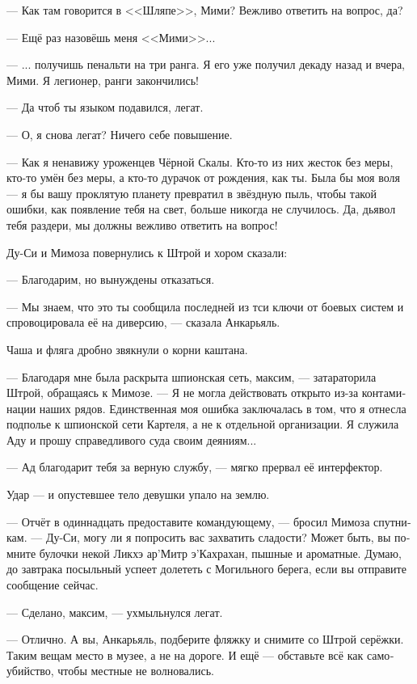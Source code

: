 \documentclass[a4paper,12pt,fleqn]{book}\usepackage{polyglossia}\setdefaultlanguage[babelshorthands=true]{russian}\setotherlanguage{english}\defaultfontfeatures{Ligatures=TeX,Mapping=tex-text}\usepackage{xcolor}\newcommand{\ml}[3]{#2}
\begin{document}
--- Как там говорится в <<Шляпе>>, Мими?
Вежливо ответить на вопрос, да?

--- Ещё раз назовёшь меня <<Мими>>...

---  ... получишь пенальти на три ранга.
Я его уже получил декаду назад и вчера, Мими.
\ml{$0$}
{Я легионер, ранги закончились!}
{I'm a leggionaire, I'm out of ranks!''}

\ml{$0$}
{--- Да чтоб ты языком подавился, легат.}
{``Choke on your tongue, legate.''}

\ml{$0$}
{--- О, я снова легат?}
{``Whoa, I'm a legate, again?}
\ml{$0$}
{Ничего себе повышение.}
{Quite a promotion.''}

--- Как я ненавижу уроженцев Чёрной Скалы.
Кто-то из них жесток без меры, кто-то умён без меры, а кто-то дурачок от рождения, как ты.
Была бы моя воля --- я бы вашу проклятую планету превратил в звёздную пыль, чтобы такой ошибки, как появление тебя на свет, больше никогда не случилось.
Да, дьявол тебя раздери, мы должны вежливо ответить на вопрос!

Ду-Си и Мимоза повернулись к Штрой и хором сказали:

--- Благодарим, но вынуждены отказаться.

--- Мы знаем, что это ты сообщила последней из тси ключи от боевых систем и спровоцировала её на диверсию, --- сказала Анкарьяль.

Чаша и фляга дробно звякнули о корни каштана.

--- Благодаря мне была раскрыта шпионская сеть, максим, --- затараторила Штрой, обращаясь к Мимозе.
--- Я не могла действовать открыто из-за контаминации наших рядов.
Единственная моя ошибка заключалась в том, что я отнесла подполье к шпионской сети Картеля, а не к отдельной организации.
Я служила Аду и прошу справедливого суда своим деяниям...

--- Ад благодарит тебя за верную службу, --- мягко прервал её интерфектор.

Удар --- и опустевшее тело девушки упало на землю.

--- Отчёт в одиннадцать предоставите командующему, --- бросил Мимоза спутникам.
--- Ду-Си, могу ли я попросить вас захватить сладости?
Может быть, вы помните булочки некой Ликхэ ар’Митр э’Кахрахан, пышные и ароматные.
Думаю, до завтрака посыльный успеет долететь с Могильного берега, если вы отправите сообщение сейчас.

--- Сделано, максим, --- ухмыльнулся легат.

--- Отлично.
А вы, Анкарьяль, подберите фляжку и снимите со Штрой серёжки.
Таким вещам место в музее, а не на дороге.
И ещё --- обставьте всё как самоубийство, чтобы местные не волновались.
\end{document}
